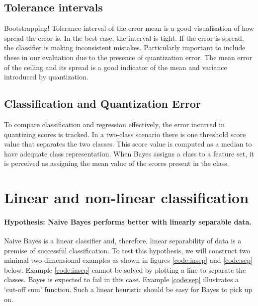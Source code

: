 \documentclass[12pt,notitlepage,twoside]{scrreprt}
\begin{document}
\subsection{Tolerance intervals}
Bootstrapping!
Tolerance interval of the error mean is a good visualisation of how spread the error is.
In the best case, the interval is tight. If the error is spread, the classifier is making
inconsistent mistakes. Particularly important to include these in our evaluation due to
the presence of quantization error. The mean error of the ceiling and its spread is a good
indicator of the mean and variance introduced by quantization.
\subsection{Classification and Quantization Error}
To compare classification and regression effectively, the error incurred in quantizing
scores is tracked. In a two-class scenario there is one threshold score value that
separates the two classes. This score value is computed as a median to have adequate class
representation. When Bayes assigns a class to a feature set, it is perceived as assigning
the mean value of the scores present in the class. 
\section{Linear and non-linear classification}
\paragraph{Hypothesis: Naive Bayes performs better with linearly separable data.}

Naive Bayes is a linear classifier and, therefore, linear separability of data is a
premise of successful classification. To test this hypothesis, we will construct two
minimal two-dimensional examples as shown in figures \ref{code:insep} and \ref{code:sep}
below. Example \ref{code:insep} cannot be solved by plotting a line to separate the
classes. Bayes is expected to fail in this case. Example \ref{code:sep} illustrates a
`cut-off sum' function. Such a linear heuristic should be easy for Bayes to pick up on.
\end{document}
